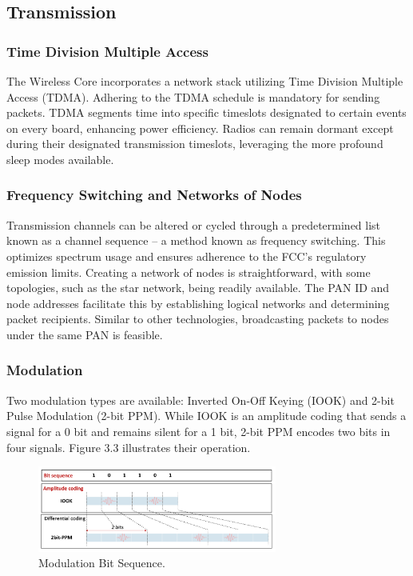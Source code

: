 

\subsection{Transmission}

\subsubsection{Time Division Multiple Access}
The Wireless Core incorporates a network stack utilizing Time Division Multiple Access (TDMA). Adhering to the TDMA schedule is mandatory for sending packets. TDMA segments time into specific timeslots designated to certain events on every board, enhancing power efficiency. Radios can remain dormant except during their designated transmission timeslots, leveraging the more profound sleep modes available.


\subsubsection{Frequency Switching and Networks of Nodes}
Transmission channels can be altered or cycled through a predetermined list known as a channel sequence – a method known as frequency switching. This optimizes spectrum usage and ensures adherence to the FCC's regulatory emission limits. Creating a network of nodes is straightforward, with some topologies, such as the star network, being readily available. The PAN ID and node addresses facilitate this by establishing logical networks and determining packet recipients. Similar to other technologies, broadcasting packets to nodes under the same PAN is feasible.


\subsubsection{Modulation}
Two modulation types are available: Inverted On-Off Keying (IOOK) and 2-bit Pulse Modulation (2-bit PPM). While IOOK is an amplitude coding that sends a signal for a 0 bit and remains silent for a 1 bit, 2-bit PPM encodes two bits in four signals. Figure 3.3 illustrates their operation.

\begin{figure}[h]
\centering
\includegraphics[width=0.7\textwidth]{images/modulation_bit_sequence.png}
\caption{Modulation Bit Sequence.}
\label{fig:modulation_bit_sequence}
\end{figure}

